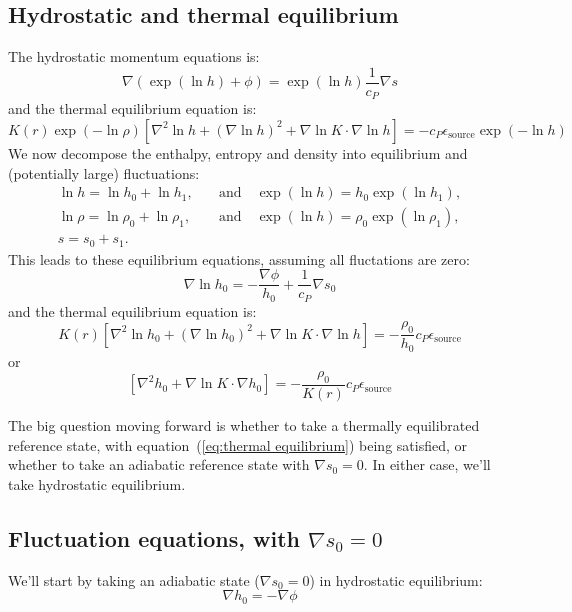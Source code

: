 \documentclass{aastex62}
\newcommand{\del}{\nabla}
\begin{document}
\subsection{Hydrostatic and thermal equilibrium}
The hydrostatic momentum equations is:
\begin{equation}
  \del (\exp(\ln h) + \phi) = \exp(\ln h)\frac{1}{c_P}\del s
\end{equation}
and the thermal equilibrium equation is:
\begin{equation}
  K(r) \exp(-\ln \rho)\left[\nabla^2 \ln h + \left(\nabla \ln h\right)^2 + \del \ln K \cdot \del \ln h \right] = - c_P \epsilon_\mathrm{source} \exp(-\ln h)
\end{equation}
We now decompose the enthalpy, entropy and density into equilibrium and (potentially large) fluctuations:
\begin{align}
  \ln h = \ln h_0 + \ln h_1, &\quad \text{and} \quad \exp(\ln h) = h_0 \exp(\ln h_1),\\
  \ln \rho = \ln \rho_0 + \ln \rho_1, &\quad \text{and} \quad \exp(\ln h) = \rho_0 \exp(\ln \rho_1),\\
  s = s_0 + s_1.
\end{align}
This leads to these equilibrium equations, assuming all fluctations are zero:
\begin{equation}
  \del \ln h_0 = -\frac{\del \phi}{h_0} + \frac{1}{c_P}\del s_0
\end{equation}
and the thermal equilibrium equation is:
\begin{equation}
  K(r) \left[\nabla^2 \ln h_0 + \left(\nabla \ln h_0\right)^2 + \del \ln K \cdot \del \ln h \right] = - \frac{\rho_0}{h_0} c_P \epsilon_\mathrm{source}
\end{equation}
or
\begin{equation}
  \left[\nabla^2 h_0 + \del \ln K \cdot \del h_0 \right] = - \frac{\rho_0}{K(r) } c_P \epsilon_\mathrm{source}
  \label{eq:thermal equilibrium}
\end{equation}

The big question moving forward is whether to take a thermally equilibrated reference state, with equation~(\ref{eq:thermal equilibrium}) being satisfied, or whether to take an adiabatic reference state with $\del s_0 = 0$.  In either case, we'll take hydrostatic equilibrium.

\subsection{Fluctuation equations, with $\del s_0 = 0$}
We'll start by taking an adiabatic state ($\del s_0 = 0$) in hydrostatic equilibrium:
\begin{equation}
  \del h_0 = - \del \phi
\end{equation}
\end{document}
